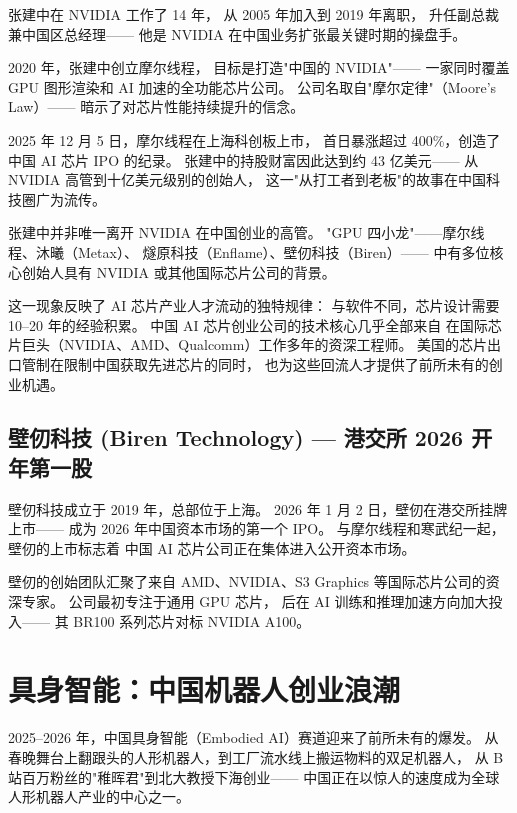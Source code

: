 张建中在 NVIDIA 工作了 14 年，
从 2005 年加入到 2019 年离职，
升任副总裁兼中国区总经理——
他是 NVIDIA 在中国业务扩张最关键时期的操盘手。

2020 年，张建中创立摩尔线程，
目标是打造"中国的 NVIDIA"——
一家同时覆盖 GPU 图形渲染和 AI 加速的全功能芯片公司。
公司名取自"摩尔定律"（Moore's Law）——
暗示了对芯片性能持续提升的信念。

2025 年 12 月 5 日，摩尔线程在上海科创板上市，
首日暴涨超过 400\%，创造了中国 AI 芯片 IPO 的纪录。
张建中的持股财富因此达到约 43 亿美元——
从 NVIDIA 高管到十亿美元级别的创始人，
这一"从打工者到老板"的故事在中国科技圈广为流传。

\begin{whybox}
张建中并非唯一离开 NVIDIA 在中国创业的高管。
"GPU 四小龙"——摩尔线程、沐曦（Metax）、
燧原科技（Enflame）、壁仞科技（Biren）——
中有多位核心创始人具有 NVIDIA 或其他国际芯片公司的背景。

这一现象反映了 AI 芯片产业人才流动的独特规律：
与软件不同，芯片设计需要 10--20 年的经验积累。
中国 AI 芯片创业公司的技术核心几乎全部来自
在国际芯片巨头（NVIDIA、AMD、Qualcomm）工作多年的资深工程师。
美国的芯片出口管制在限制中国获取先进芯片的同时，
也为这些回流人才提供了前所未有的创业机遇。
\end{whybox}


\subsection{壁仞科技 (Biren Technology) — 港交所 2026 开年第一股}

壁仞科技成立于 2019 年，总部位于上海。
2026 年 1 月 2 日，壁仞在港交所挂牌上市——
成为 2026 年中国资本市场的第一个 IPO。
与摩尔线程和寒武纪一起，壁仞的上市标志着
中国 AI 芯片公司正在集体进入公开资本市场。

壁仞的创始团队汇聚了来自 AMD、NVIDIA、S3 Graphics
等国际芯片公司的资深专家。
公司最初专注于通用 GPU 芯片，
后在 AI 训练和推理加速方向加大投入——
其 BR100 系列芯片对标 NVIDIA A100。



\section{具身智能：中国机器人创业浪潮}
\label{sec:china-robotics}

2025--2026 年，中国具身智能（Embodied AI）赛道迎来了前所未有的爆发。
从春晚舞台上翻跟头的人形机器人，到工厂流水线上搬运物料的双足机器人，
从 B 站百万粉丝的"稚晖君"到北大教授下海创业——
中国正在以惊人的速度成为全球人形机器人产业的中心之一。

